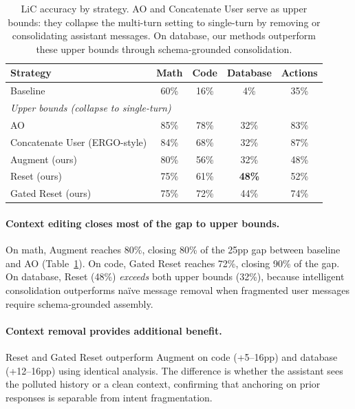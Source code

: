 \documentclass{article} %
\begin{document}
\begin{table}[t]
\centering
\begin{tabular}{lcccc}
\toprule
\textbf{Strategy} & \textbf{Math} & \textbf{Code} & \textbf{Database} & \textbf{Actions} \\
\midrule
Baseline & 60\% & 16\% & 4\% & 35\% \\
\midrule
\multicolumn{5}{l}{\emph{Upper bounds (collapse to single-turn)}} \\
\quad AO \citep{huang2026context} & 85\% & 78\% & 32\% & 83\% \\
\quad Concatenate User (ERGO-style) & 84\% & 68\% & 32\% & 87\% \\
\midrule
Augment (ours) & 80\% & 56\% & 32\% & 48\% \\
Reset (ours) & 75\% & 61\% & \textbf{48\%} & 52\% \\
Gated Reset (ours) & 75\% & 72\% & 44\% & 74\% \\
\bottomrule
\end{tabular}
\caption{LiC accuracy by strategy. AO and Concatenate User serve as upper bounds: they collapse the multi-turn setting to single-turn by removing or consolidating assistant messages. On database, our methods outperform these upper bounds through schema-grounded consolidation.}
\label{tab:lic-main}
\end{table}

\paragraph{Context editing closes most of the gap to upper bounds.}
On math, Augment reaches 80\%, closing 80\% of the 25pp gap between baseline and AO (Table~\ref{tab:lic-main}). On code, Gated Reset reaches 72\%, closing 90\% of the gap. On database, Reset (48\%) \emph{exceeds} both upper bounds (32\%), because intelligent consolidation outperforms na\"ive message removal when fragmented user messages require schema-grounded assembly.

\paragraph{Context removal provides additional benefit.}
Reset and Gated Reset outperform Augment on code (+5--16pp) and database (+12--16pp) using identical analysis. The difference is whether the assistant sees the polluted history or a clean context, confirming that anchoring on prior responses is separable from intent fragmentation.
\end{document}
